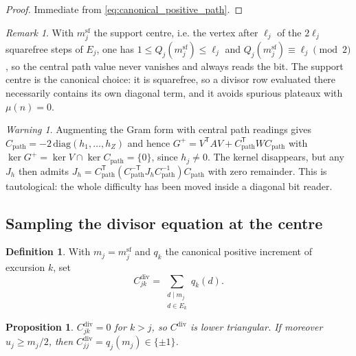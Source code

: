 \documentclass[11pt]{amsart}
\numberwithin{equation}{section}
\theoremstyle{plain}
\newtheorem{proposition}[theorem]{Proposition}
\theoremstyle{definition}
\newtheorem{definition}[theorem]{Definition}
\theoremstyle{remark}
\newtheorem{remark}[theorem]{Remark}
\newtheorem{warning}[theorem]{Warning}
\begin{document}
\begin{proof}
Immediate from \eqref{eq:canonical_positive_path}.
\end{proof}

\begin{remark}
\label{rem:center_values_never_vanish}
With $m_j^{\mathrm{sf}}$ the support centre, i.e. the vertex after
$\ell_j$ of the $2\ell_j$ squarefree steps of $E_j$, one has
$1\le Q_j(m_j^{\mathrm{sf}})\le\ell_j$ and
$Q_j(m_j^{\mathrm{sf}})\equiv\ell_j\pmod 2$, so the central path value
never vanishes and always reads the bit. The support centre is the
canonical choice: it is squarefree, so a divisor row evaluated there
necessarily contains its own diagonal term, and it avoids spurious
plateaux with $\mu(n)=0$.
\end{remark}

\begin{warning}
\label{warn:path_reading_is_tautological}
Augmenting the Gram form with central path readings gives
$C_{\mathrm{path}}=-2\,\mathrm{diag}(h_1,\dots,h_Z)$ and hence
$G^{+}=V^{\mathsf T}AV+C_{\mathrm{path}}^{\mathsf T}WC_{\mathrm{path}}$
with $\ker G^{+}=\ker V\cap\ker C_{\mathrm{path}}=\{0\}$, since
$h_j\ne0$. The kernel disappears, but any $J_h$ then admits
$J_h=C_{\mathrm{path}}^{\mathsf T}(C_{\mathrm{path}}^{-\mathsf T}
J_hC_{\mathrm{path}}^{-1})C_{\mathrm{path}}$ with zero remainder. This is
tautological: the whole difficulty has been moved inside a diagonal bit
reader.
\end{warning}

\subsection{Sampling the divisor equation at the centre}
\label{subsec:divisor_rows_at_centers}

\begin{definition}
\label{def:cdiv}
With $m_j=m_j^{\mathrm{sf}}$ and $q_k$ the canonical positive increment
of excursion $k$, set
\begin{equation}
C^{\mathrm{div}}_{jk}=\sum_{\substack{d\mid m_j\\ d\in E_k}}q_k(d).
\label{eq:cdiv}
\end{equation}
\end{definition}

\begin{proposition}
\label{prop:cdiv_triangular}
$C^{\mathrm{div}}_{jk}=0$ for $k>j$, so $C^{\mathrm{div}}$ is lower
triangular. If moreover $u_j\ge m_j/2$, then $C^{\mathrm{div}}_{jj}
=q_j(m_j)\in\{\pm1\}$.
\end{proposition}
\end{document}
